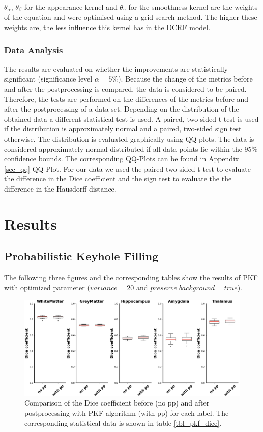 \documentclass[journal]{IEEEtran}
\begin{document}
$\theta_\alpha$, $\theta_\beta$ for the appearance kernel and $\theta_\gamma$ for the smoothness kernel are the weights of the equation and were optimised using a grid search method. The higher these weights are, the less influence this kernel has in the DCRF model.
\subsubsection{Data Analysis}
The results are evaluated on whether the improvements are statistically significant (significance level $\alpha = 5\%$). Because the change of the metrics before and after the postprocessing is compared, the data is considered to be paired. Therefore, the tests are performed on the differences of the metrics before and after the postprocessing of a data set. Depending on the distribution of the obtained data a different statistical test is used. A paired, two-sided t-test is used if the distribution is approximately normal and a paired, two-sided sign test otherwise. The distribution is evaluated graphically using QQ-plots. The data is considered approximately normal distributed if all data points lie within the $95\%$ confidence bounds. The corresponding QQ-Plots can be found in Appendix \ref{sec_qq} QQ-Plot. For our data we used the paired two-sided t-test to evaluate the difference in the Dice coefficient and the sign test to evaluate the the difference in the Hausdorff distance. 
\onecolumn
\section{Results}

\newcommand{\expnumber}[2]{{#1}\mathrm{e}{#2}}
\subsection{Probabilistic Keyhole Filling}
The following three figures and the corresponding tables show the results of PKF with optimized parameter ($variance = 20$ and $preserve\; background = true$).

\begin{figure}[ht]
\centering

\includegraphics[width=\textwidth]{img/boxplots/PKF-Dice.png}

\caption{Comparison of the Dice coefficient before (no pp) and after postprocessing with PKF algorithm (with pp) for each label. The corresponding statistical data is shown in table \ref{tbl_pkf_dice}.
} 
\label{fig_pkf_dice}
\end{figure}
\end{document}
